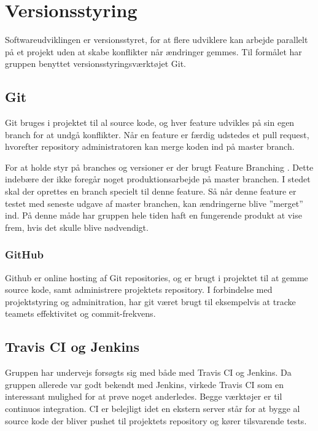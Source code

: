 \section{Versionsstyring}
Softwareudviklingen er versionsstyret, for at flere udviklere kan arbejde parallelt på et projekt uden at skabe konflikter når ændringer gemmes. Til formålet har gruppen benyttet versionsstyringsværktøjet Git.

\subsection{Git} 
Git bruges i projektet til al source kode, og hver feature udvikles på sin egen branch for at undgå konflikter. Når en feature er færdig udstedes et pull request, hvorefter repository administratoren kan merge koden ind på master branch.

For at holde styr på branches og versioner er der brugt Feature Branching \cite{atlassian2016}. Dette indebære der ikke foregår noget produktionsarbejde på master branchen. I stedet skal der oprettes en branch specielt til denne feature. Så når denne feature er testet med seneste udgave af master branchen, kan ændringerne blive ''merget'' ind. På denne måde har gruppen hele tiden haft en fungerende produkt at vise frem, hvis det skulle blive nødvendigt.

\subsubsection{GitHub}
Github er online hosting af Git repositories, og er brugt i projektet til at gemme source kode, samt administrere projektets repository. I forbindelse med projektstyring og adminitration, har git været brugt til eksempelvis at tracke teamets effektivitet og commit-frekvens.

\subsection{Travis CI og Jenkins} 
Gruppen har undervejs forsøgts sig med både med Travis CI og Jenkins. Da gruppen allerede var godt bekendt med Jenkins, virkede Travis CI som en interessant mulighed for at prøve noget anderledes. 
Begge værktøjer er til continuos integration. CI er belejligt idet en ekstern server står for at bygge al source kode der bliver pushet til projektets repository og kører tilsvarende tests.

